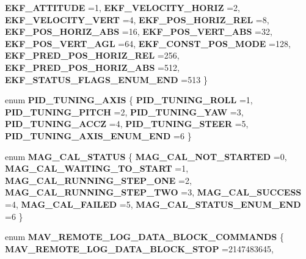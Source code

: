\begin{DoxyCompactItemize}
\textbf{ E\+K\+F\+\_\+\+A\+T\+T\+I\+T\+U\+DE} =1, 
\textbf{ E\+K\+F\+\_\+\+V\+E\+L\+O\+C\+I\+T\+Y\+\_\+\+H\+O\+R\+IZ} =2, 
\textbf{ E\+K\+F\+\_\+\+V\+E\+L\+O\+C\+I\+T\+Y\+\_\+\+V\+E\+RT} =4, 
\textbf{ E\+K\+F\+\_\+\+P\+O\+S\+\_\+\+H\+O\+R\+I\+Z\+\_\+\+R\+EL} =8, 
\newline
\textbf{ E\+K\+F\+\_\+\+P\+O\+S\+\_\+\+H\+O\+R\+I\+Z\+\_\+\+A\+BS} =16, 
\textbf{ E\+K\+F\+\_\+\+P\+O\+S\+\_\+\+V\+E\+R\+T\+\_\+\+A\+BS} =32, 
\textbf{ E\+K\+F\+\_\+\+P\+O\+S\+\_\+\+V\+E\+R\+T\+\_\+\+A\+GL} =64, 
\textbf{ E\+K\+F\+\_\+\+C\+O\+N\+S\+T\+\_\+\+P\+O\+S\+\_\+\+M\+O\+DE} =128, 
\newline
\textbf{ E\+K\+F\+\_\+\+P\+R\+E\+D\+\_\+\+P\+O\+S\+\_\+\+H\+O\+R\+I\+Z\+\_\+\+R\+EL} =256, 
\textbf{ E\+K\+F\+\_\+\+P\+R\+E\+D\+\_\+\+P\+O\+S\+\_\+\+H\+O\+R\+I\+Z\+\_\+\+A\+BS} =512, 
\textbf{ E\+K\+F\+\_\+\+S\+T\+A\+T\+U\+S\+\_\+\+F\+L\+A\+G\+S\+\_\+\+E\+N\+U\+M\+\_\+\+E\+ND} =513
 \}
\item 
enum \textbf{ P\+I\+D\+\_\+\+T\+U\+N\+I\+N\+G\+\_\+\+A\+X\+IS} \{ \newline
\textbf{ P\+I\+D\+\_\+\+T\+U\+N\+I\+N\+G\+\_\+\+R\+O\+LL} =1, 
\textbf{ P\+I\+D\+\_\+\+T\+U\+N\+I\+N\+G\+\_\+\+P\+I\+T\+CH} =2, 
\textbf{ P\+I\+D\+\_\+\+T\+U\+N\+I\+N\+G\+\_\+\+Y\+AW} =3, 
\textbf{ P\+I\+D\+\_\+\+T\+U\+N\+I\+N\+G\+\_\+\+A\+C\+CZ} =4, 
\newline
\textbf{ P\+I\+D\+\_\+\+T\+U\+N\+I\+N\+G\+\_\+\+S\+T\+E\+ER} =5, 
\textbf{ P\+I\+D\+\_\+\+T\+U\+N\+I\+N\+G\+\_\+\+A\+X\+I\+S\+\_\+\+E\+N\+U\+M\+\_\+\+E\+ND} =6
 \}
\item 
enum \textbf{ M\+A\+G\+\_\+\+C\+A\+L\+\_\+\+S\+T\+A\+T\+US} \{ \newline
\textbf{ M\+A\+G\+\_\+\+C\+A\+L\+\_\+\+N\+O\+T\+\_\+\+S\+T\+A\+R\+T\+ED} =0, 
\textbf{ M\+A\+G\+\_\+\+C\+A\+L\+\_\+\+W\+A\+I\+T\+I\+N\+G\+\_\+\+T\+O\+\_\+\+S\+T\+A\+RT} =1, 
\textbf{ M\+A\+G\+\_\+\+C\+A\+L\+\_\+\+R\+U\+N\+N\+I\+N\+G\+\_\+\+S\+T\+E\+P\+\_\+\+O\+NE} =2, 
\textbf{ M\+A\+G\+\_\+\+C\+A\+L\+\_\+\+R\+U\+N\+N\+I\+N\+G\+\_\+\+S\+T\+E\+P\+\_\+\+T\+WO} =3, 
\newline
\textbf{ M\+A\+G\+\_\+\+C\+A\+L\+\_\+\+S\+U\+C\+C\+E\+SS} =4, 
\textbf{ M\+A\+G\+\_\+\+C\+A\+L\+\_\+\+F\+A\+I\+L\+ED} =5, 
\textbf{ M\+A\+G\+\_\+\+C\+A\+L\+\_\+\+S\+T\+A\+T\+U\+S\+\_\+\+E\+N\+U\+M\+\_\+\+E\+ND} =6
 \}
\item 
enum \textbf{ M\+A\+V\+\_\+\+R\+E\+M\+O\+T\+E\+\_\+\+L\+O\+G\+\_\+\+D\+A\+T\+A\+\_\+\+B\+L\+O\+C\+K\+\_\+\+C\+O\+M\+M\+A\+N\+DS} \{ \textbf{ M\+A\+V\+\_\+\+R\+E\+M\+O\+T\+E\+\_\+\+L\+O\+G\+\_\+\+D\+A\+T\+A\+\_\+\+B\+L\+O\+C\+K\+\_\+\+S\+T\+OP} =2147483645, 

\end{DoxyCompactItemize}
